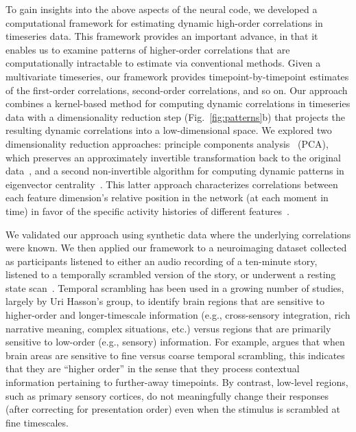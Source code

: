 \documentclass[english]{article}
\begin{document}
To gain insights into the above aspects of the neural code, we
developed a computational framework for estimating dynamic high-order
correlations in timeseries data. This framework provides an important
advance, in that it enables us to examine patterns of higher-order
correlations that are computationally intractable to estimate via
conventional methods.  Given a multivariate timeseries, our framework
provides timepoint-by-timepoint estimates of the first-order
correlations, second-order correlations, and so on.  Our approach
combines a kernel-based method for computing dynamic correlations in
timeseries data with a dimensionality reduction step
(Fig.~\ref{fig:patterns}b) that projects the resulting dynamic
correlations into a low-dimensional space.  We explored two
dimensionality reduction approaches: principle components
analysis~\cite{Pear01} (PCA), which preserves an approximately
invertible transformation back to the original data~\cite{McInJirs19, TokeSomm19,
  GonzEtal19}, and a second non-invertible algorithm for computing
dynamic patterns in eigenvector centrality~\cite{Land95}.  This
latter approach characterizes correlations between each feature
dimension's relative position in the network (at each moment
in time) in favor of the specific activity histories of different
features~\cite{BetzEtal19, SizeEtal18, ReimEtal17}.

We validated our approach using synthetic data where the underlying
correlations were known.  We then applied our framework to a
neuroimaging dataset collected as participants listened to either an
audio recording of a ten-minute story, listened to a temporally
scrambled version of the story, or underwent a resting state
scan~\cite{SimoEtal16}.  Temporal scrambling has been used in a
growing number of studies, largely by Uri Hasson's group, to identify
brain regions that are sensitive to higher-order and longer-timescale
information (e.g., cross-sensory integration, rich narrative meaning,
complex situations, etc.) versus regions that are primarily sensitive
to low-order (e.g., sensory) information.  For example,
\cite{HassEtal08} argues that when brain areas are sensitive to fine
versus coarse temporal scrambling, this indicates that they are
``higher order'' in the sense that they process contextual information
pertaining to further-away timepoints.  By contrast, low-level
regions, such as primary sensory cortices, do not meaningfully change
their responses (after correcting for presentation order) even when
the stimulus is scrambled at fine timescales.
\end{document}
